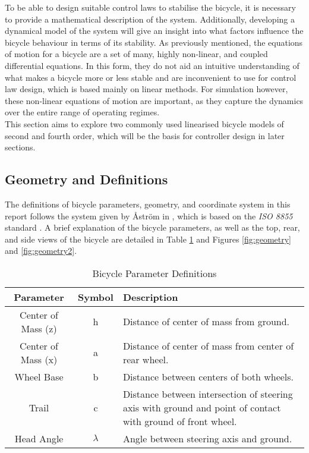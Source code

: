 To be able to design suitable control laws to stabilise the bicycle, it is necessary to provide a mathematical description of the system. Additionally, developing a dynamical model of the system will give an insight into what factors influence the bicycle behaviour in terms of its stability.
As previously mentioned, the equations of motion for a bicycle are a set of many, highly non-linear, and coupled differential equations. In this form, they do not aid an intuitive understanding of what makes a bicycle more or less stable and are inconvenient to use for control law design, which is based mainly on linear methods. For simulation however, these non-linear equations of motion are important, as they capture the dynamics over the entire range of operating regimes. \\
This section aims to explore two commonly used linearised bicycle models of second and fourth order, which will be the basis for controller design in later sections.

\subsection{Geometry and Definitions}
The definitions of bicycle parameters, geometry, and coordinate system in this report follows the system given by {\AA}str{\"o}m in \cite{astrom}, which is based on the \textit{ISO 8855} standard \cite{iso}. A brief explanation of the bicycle parameters, as well as the top, rear, and side views of the bicycle are detailed in Table \ref{table:params} and Figures \ref{fig:geometry} and \ref{fig:geometry2}.

\begin{table}[H]
	\centering
 	\begin{tabular}[t]{c c p{10cm}} 
	\toprule
	Parameter & Symbol & Description \\
 	\midrule
 	Center of Mass (z) & h & Distance of center of mass from ground.\\ 
 	Center of Mass (x) & a & Distance of center of mass from center of rear wheel.\\
 	Wheel Base & b & Distance between centers of both wheels.\\
 	Trail & c & Distance between intersection of steering axis with ground and point of contact with ground of front wheel.\\
 	Head Angle & $\lambda$ & Angle between steering axis and ground.\\
 	\bottomrule
	\end{tabular}
 	\caption{Bicycle Parameter Definitions}
	\label{table:params}
\end{table}

